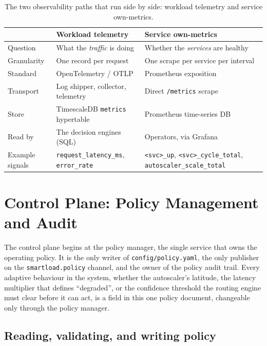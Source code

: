 \begin{table}[H]
\centering
\caption[The two observability paths side by side]{The two observability paths that run side by side: workload telemetry and service own-metrics.}
\label{tab:ima:observability}
\small
\begin{tabularx}{\linewidth}{@{}l Y Y@{}}
\toprule
 & \textbf{Workload telemetry} & \textbf{Service own-metrics} \\
\midrule
Question     & What the \emph{traffic} is doing & Whether the \emph{services} are healthy \\
Granularity  & One record per request           & One scrape per service per interval \\
Standard     & OpenTelemetry / OTLP \cite{opentelemetry} & Prometheus exposition \cite{prometheus} \\
Transport    & Log shipper, collector, telemetry & Direct \texttt{/metrics} scrape \\
Store        & TimescaleDB \texttt{metrics} hypertable & Prometheus time-series DB \\
Read by      & The decision engines (SQL) & Operators, via Grafana \cite{grafana} \\
Example signals & \texttt{request\_latency\_ms}, \texttt{error\_rate} & \texttt{<svc>\_up}, \texttt{<svc>\_cycle\_total}, \texttt{autoscaler\_scale\_total} \\
\bottomrule
\end{tabularx}
\end{table}

\section{Control Plane: Policy Management and Audit}
\label{sec:ima:policy}

The control plane begins at the policy manager, the single service that owns the
operating policy. It is the only writer of \texttt{config/policy.yaml}, the only
publisher on the \texttt{smartload.policy} channel, and the owner of the policy
audit trail. Every adaptive behaviour in the system, whether the autoscaler's
latitude, the latency multiplier that defines ``degraded'', or the confidence
threshold the routing engine must clear before it can act, is a field in this one
policy document, changeable only through the policy manager.

\subsection{Reading, validating, and writing policy}
\label{sec:ima:policyrw}

